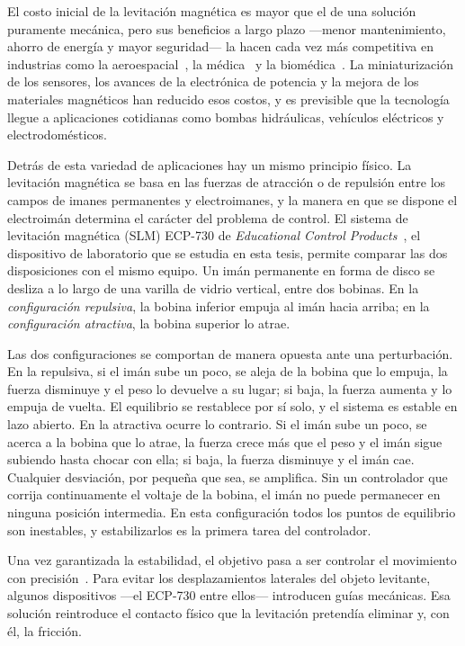 El costo inicial de la levitación magnética es mayor que el de una solución puramente mecánica, pero sus beneficios a largo plazo ---menor mantenimiento, ahorro de energía y mayor seguridad--- la hacen cada vez más competitiva en industrias como la aeroespacial~\cite{bryton}, la médica~\cite{song} y la biomédica~\cite{sajjad}. La miniaturización de los sensores, los avances de la electrónica de potencia y la mejora de los materiales magnéticos han reducido esos costos, y es previsible que la tecnología llegue a aplicaciones cotidianas como bombas hidráulicas, vehículos eléctricos y electrodomésticos.

Detrás de esta variedad de aplicaciones hay un mismo principio físico. La levitación magnética se basa en las fuerzas de atracción o de repulsión entre los campos de imanes permanentes y electroimanes, y la manera en que se dispone el electroimán determina el carácter del problema de control. El sistema de levitación magnética (SLM) ECP-730 de \emph{Educational Control Products}~\cite{730}, el dispositivo de laboratorio que se estudia en esta tesis, permite comparar las dos disposiciones con el mismo equipo. Un imán permanente en forma de disco se desliza a lo largo de una varilla de vidrio vertical, entre dos bobinas. En la \emph{configuración repulsiva}, la bobina inferior empuja al imán hacia arriba; en la \emph{configuración atractiva}, la bobina superior lo atrae.

Las dos configuraciones se comportan de manera opuesta ante una perturbación. En la repulsiva, si el imán sube un poco, se aleja de la bobina que lo empuja, la fuerza disminuye y el peso lo devuelve a su lugar; si baja, la fuerza aumenta y lo empuja de vuelta. El equilibrio se restablece por sí solo, y el sistema es estable en lazo abierto. En la atractiva ocurre lo contrario. Si el imán sube un poco, se acerca a la bobina que lo atrae, la fuerza crece más que el peso y el imán sigue subiendo hasta chocar con ella; si baja, la fuerza disminuye y el imán cae. Cualquier desviación, por pequeña que sea, se amplifica. Sin un controlador que corrija continuamente el voltaje de la bobina, el imán no puede permanecer en ninguna posición intermedia. En esta configuración todos los puntos de equilibrio son inestables, y estabilizarlos es la primera tarea del controlador.

Una vez garantizada la estabilidad, el objetivo pasa a ser controlar el movimiento con precisión~\cite{hyung}. Para evitar los desplazamientos laterales del objeto levitante, algunos dispositivos ---el ECP-730 entre ellos--- introducen guías mecánicas. Esa solución reintroduce el contacto físico que la levitación pretendía eliminar y, con él, la fricción.

